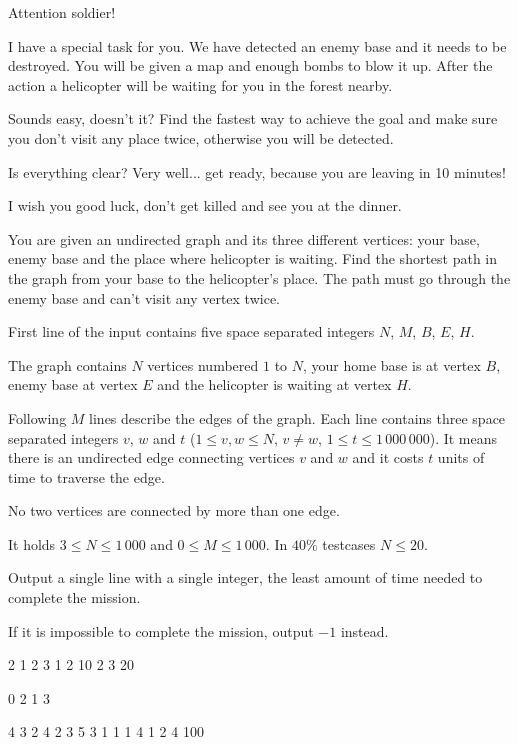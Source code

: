 





\noindent
Attention soldier!

\bigskip \noindent
I have a special task for you. We have detected an enemy base and it needs to be destroyed. You will be given a map and enough bombs to blow it up. After the action a helicopter will be waiting for you in the forest nearby.

\bigskip \noindent
Sounds easy, doesn't it? Find the fastest way to achieve the goal and make sure you don't visit any place twice, otherwise you will be detected.

\bigskip \noindent
Is everything clear? Very well... get ready, because you are leaving in 10 minutes!

\bigskip \noindent
I wish you good luck, don't get killed and see you at the dinner.


You are given an undirected graph and its three different vertices: your base, enemy base and the place where helicopter is waiting. Find the shortest path in the graph from your base to the helicopter's place. The path must go through the enemy base and can't visit any vertex twice.


First line of the input contains five space separated integers $N$, $M$, $B$, $E$, $H$.

The graph contains $N$ vertices numbered $1$ to $N$, your home base is at vertex $B$, enemy base at vertex $E$ and the helicopter is waiting at vertex $H$.

Following $M$ lines describe the edges of the graph.
Each line contains three space separated integers $v$, $w$ and $t$ ($1 \le v, w \le N$, $v \neq w$, $1 \le t \le 1\,000\,000$).
It means there is an undirected edge connecting vertices $v$ and $w$ and it costs $t$ units of time to traverse the edge.

No two vertices are connected by more than one edge.

\smallskip
It holds $3 \le N \le 1\,000$ and $0 \le M \le 1\,000$.
In $40\%$ testcases $N\le 20$.


Output a single line with a single integer, the least amount of time needed to complete the mission.

If it is impossible to complete the mission, output $-1$ instead.



 2 1 2 3
1 2 10
2 3 20
\sampleEND


\bigskip


 0 2 1 3
\sampleEND


\bigskip


 4 3 2 4
2 3 5
3 1 1
1 4 1
2 4 100
\sampleEND



